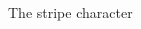 \begin{figure}[H]
{\begin{adjustbox}{width=6cm,center}
\begin{tikzpicture}
          \end{tikzpicture}
        \end{adjustbox}
      }\caption*{The stripe character}
    \end{figure}
    
